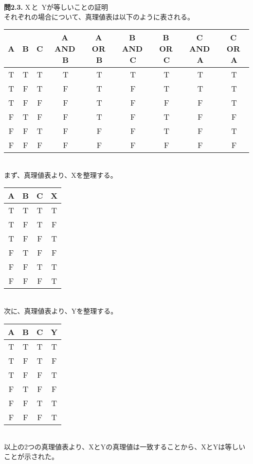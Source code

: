 \documentclass[dvipdfmx,10pt, a4j]{jarticle}
\theoremstyle{definition}
\begin{document}
    \newpage
    \noindent
    \textbf{問2.3.} X\,と\, Yが等しいことの証明\\

    それぞれの場合について、真理値表は以下のように表される。\\

    \begin{tabular}{|c|c|c|c|c|c|c|c|c|}
        \hline
        A & B & C & A\, AND\, B & A\, OR\, B & B\, AND\, C & B\, OR\, C & C\, AND\, A & C\, OR\, A\\
        \hline
        \hline
        T & T & T & T & T & T & T & T & T\\
        \hline
        T & F & T & F & T & F & T & T & T\\
        \hline
        T & F & F & F & T & F & F & F & T\\
        \hline
        F & T & F & F & T & F & T & F & F\\
        \hline
        F & F & T & F & F & F & T & F & T\\
        \hline
        F & F & F & F & F & F & F & F & F\\
        \hline
    \end{tabular}\\

    まず、真理値表より、Xを整理する。\\

    \begin{tabular}{|c|c|c|c|}
        \hline
        A & B & C & X\\
        \hline
        \hline
        T & T & T & T\\
        \hline
        T & F & T & F\\
        \hline
        T & F & F & T\\
        \hline
        F & T & F & F\\
        \hline
        F & F & T & T\\
        \hline
        F & F & F & T\\
        \hline
    \end{tabular}\\

    次に、真理値表より、Yを整理する。\\

    \begin{tabular}{|c|c|c|c|}
        \hline
        A & B & C & Y\\
        \hline
        \hline
        T & T & T & T\\
        \hline
        T & F & T & F\\
        \hline
        T & F & F & T\\
        \hline
        F & T & F & F\\
        \hline
        F & F & T & T\\
        \hline
        F & F & F & T\\
        \hline
    \end{tabular}\\

    以上の2つの真理値表より、XとYの真理値は一致することから、XとYは等しいことが示された。
\end{document}
